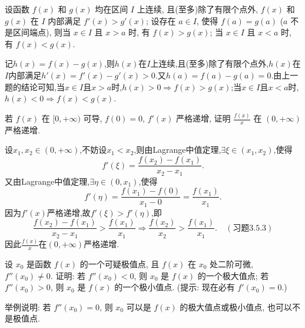 \begin{exercise}[3.3.17]\label{ex:3.3.17}
    设函数 $f(x)$ 和 $g(x)$ 均在区间 $I$ 上连续, 且(至多)除了有限个点外, $f(x)$ 和 $g(x)$ 在 $I$ 内部满足 $f'(x) > g'(x)$; 设存在 $a \in I$, 使得 $f(a)=g(a)$ ($a$ 不是区间端点), 则当 $x \in I$ 且 $x>a$ 时, 有 $f(x)>g(x)$; 当 $x \in I$ 且 $x<a$ 时, 有 $f(x)<g(x)$.
\end{exercise}

\begin{solution}
    记$h(x) = f(x) - g(x)$,则$h(x)$在$I$上连续,且(至多)除了有限个点外,$h(x)$在$I$内部满足$h'(x) = f'(x) - g'(x) > 0$.又$h(a) = f(a) - g(a) = 0$.由上一题的结论可知,当$x \in I$且$x > a$时,$h(x) > 0 \Rightarrow f(x) > g(x)$;当$x \in I$且$x < a$时,$h(x) < 0 \Rightarrow f(x) < g(x)$.
\end{solution}

\begin{exercise}[3.3.18]
    若 $f(x)$ 在 $[0, +\infty)$ 可导, $f(0)=0$, $f'(x)$ 严格递增, 证明 $\frac{f(x)}{x}$ 在 $(0, +\infty)$ 严格递增.
\end{exercise}

\begin{solution}
    设$x_1,x_2 \in (0,+\infty)$,不妨设$x_1 < x_2$,则由Lagrange中值定理,$\exists \xi \in (x_1,x_2)$,使得
    $$
        f'(\xi) = \frac{f(x_2)-f(x_1)}{x_2 - x_1}.
    $$
    又由Lagrange中值定理,$\exists \eta \in (0,x_1)$,使得
    $$
        f'(\eta) = \frac{f(x_1)-f(0)}{x_1 - 0} = \frac{f(x_1)}{x_1}.
    $$
    因为$f'(x)$严格递增,故$f'(\xi) > f'(\eta)$,即
    $$
        \frac{f(x_2)-f(x_1)}{x_2 - x_1} > \frac{f(x_1)}{x_1} \Rightarrow \frac{f(x_2)}{x_2} > \frac{f(x_1)}{x_1}. \quad (\hyperref[3.5.3]{\text{习题3.5.3}})
    $$
    因此$\frac{f(x)}{x}$在$(0,+\infty)$严格递增.
\end{solution}

\begin{exercise}[3.3.19]
    设 $x_0$ 是函数 $f(x)$ 的一个可疑极值点, 且 $f(x)$ 在 $x_0$ 处二阶可微, $f''(x_0) \ne 0$. 证明: 若 $f''(x_0)<0$, 则 $x_0$ 是 $f(x)$ 的一个极大值点; 若 $f''(x_0)>0$, 则 $x_0$ 是 $f(x)$ 的一个极小值点. (提示: 现在必有 $f'(x_0)=0$.)

    举例说明: 若 $f''(x_0)=0$, 则 $x_0$ 可以是 $f(x)$ 的极大值点或极小值点, 也可以不是极值点.
\end{exercise}

